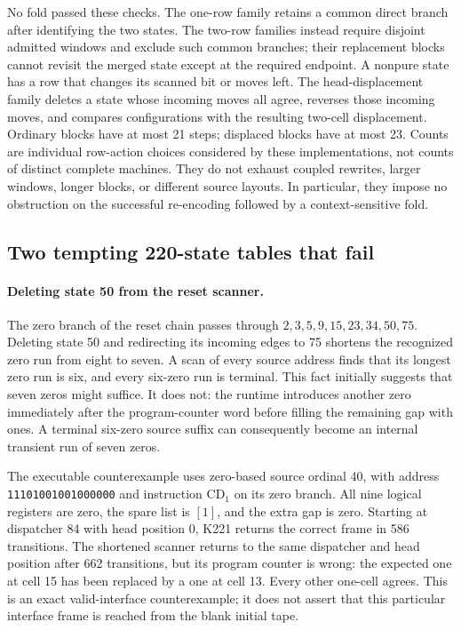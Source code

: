 No fold passed these checks.  The one-row family retains a common direct
branch after identifying the two states.  The two-row families instead require
disjoint admitted windows and exclude such common branches; their replacement
blocks cannot revisit the merged state except at the required endpoint.  A
nonpure state has a row that changes its scanned bit or moves left.  The
head-displacement family deletes a state whose incoming moves all agree,
reverses those incoming moves, and compares configurations with the resulting
two-cell displacement.  Ordinary blocks have at most 21 steps; displaced
blocks have at most 23.  Counts are individual row-action choices considered
by these implementations, not counts of distinct complete machines.
They do not exhaust coupled rewrites, larger windows, longer blocks, or
different source layouts.  In particular, they impose no obstruction on the
successful re-encoding followed by a context-sensitive fold.

\subsection{Two tempting 220-state tables that fail}

\paragraph{Deleting state 50 from the reset scanner.}
The zero branch of the reset chain passes through
$2,3,5,9,15,23,34,50,75$.  Deleting state 50 and redirecting its incoming edges
to 75 shortens the recognized zero run from eight to seven.  A scan of every
source address finds that its longest zero run is six, and every six-zero run
is terminal.  This fact initially suggests that seven zeros might suffice.
It does not: the runtime introduces another zero immediately after the
program-counter word before filling the remaining gap with ones.  A terminal
six-zero source suffix can consequently become an internal transient run of
seven zeros.

The executable counterexample uses zero-based source ordinal 40, with address
\texttt{11101001001000000} and instruction $\mathrm{CD}_1$ on its zero branch.
All nine logical registers are zero, the spare list is $[1]$, and the extra
gap is zero.  Starting at dispatcher 84 with head position 0, K221 returns the
correct frame in 586 transitions.  The shortened scanner returns to the same
dispatcher and head position after 662 transitions, but its program counter
is wrong: the expected one at cell 15 has been replaced by a one at cell 13.
Every other one-cell agrees.  This is an exact valid-interface counterexample;
it does not assert that this particular interface frame is reached from the
blank initial tape.


